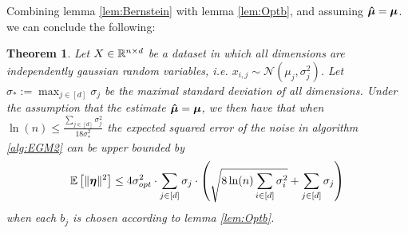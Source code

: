\documentclass[a4paper,12pt]{article}
\newtheorem{theorem}{Theorem}
\begin{document}
\noindent Combining lemma \ref{lem:Bernstein} with lemma \ref{lem:Optb}, and assuming $\bm{\hat{\mu}} = \bm{\mu}$.
we can conclude the following:

\begin{theorem}
\label{theo:Alg3OptErr}
Let $X \in \mathbb{R}^{n \times d}$ be a dataset in which all dimensions are independently gaussian random variables, i.e. $x_{i,j} \sim \mathcal{N}(\mu_j, \sigma_j^2)$. 
Let $\sigma_* := \max_{j \in [d]} \sigma_j$ be the maximal standard deviation of all dimensions. 
Under the assumption that the estimate $\bm{\hat{\mu}} = \bm{\mu}$, we then have that
when $\ln (n) \le \frac{\sum_{j \in [d]} \sigma_j^2}{18 \sigma_*^2}$ 
the expected squared error of the noise in algorithm \ref{alg:EGM2} can be upper bounded by 
\[
    \mathbb{E} \left [ \| \bm{\eta} \|^2 \right] \le 4\sigma_{opt}^2  \cdot \sum_{j \in [d]} \sigma_j \cdot
    \left ( \sqrt{8\ln(n) \sum_{i \in [d]} \sigma_i^2} + \sum_{j \in [d]} \sigma_j \right)
\]
when each $b_j$ is chosen according to lemma \ref{lem:Optb}.
\end{theorem}
\end{document}
